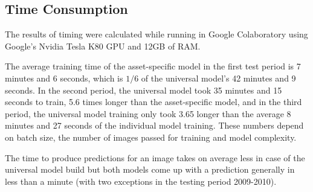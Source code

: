 \documentclass[11pt, a4paper]{article}
\begin{document}
\subsection{Time Consumption}
\label{subsec:ER:TimePerf}

The results of timing were calculated while running in Google Colaboratory using Google's Nvidia Tesla K80 GPU and 12GB of RAM.

The average training time of the asset-specific model in the first test period is 7 minutes and 6 seconds, which is $1/6$ of the universal model's 42 minutes and 9 seconds. In the second period, the universal model took 35 minutes and 15 seconds to train, 5.6 times longer than the asset-specific model, and in the third period, the universal model training only took 3.65 longer than the average 8 minutes and 27 seconds of the individual model training. These numbers depend on batch size, the number of images passed for training and model complexity.

The time to produce predictions for an image takes on average less in case of the universal model build but both models come up with a prediction generally in less than a minute (with two exceptions in the testing period 2009-2010).
\end{document}
